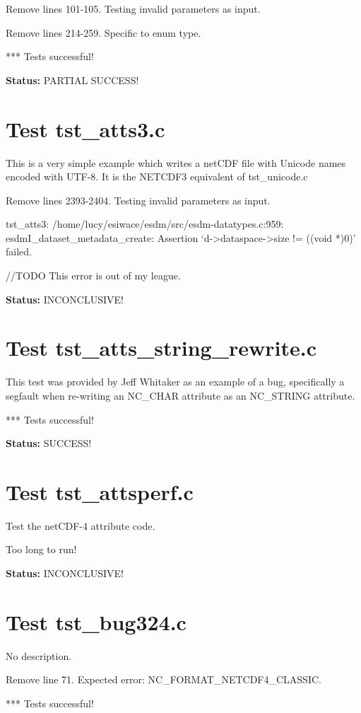 Remove lines 101-105. Testing invalid parameters as input.

Remove lines 214-259. Specific to enum type.

*** Tests successful!

{\bf \large Status: } PARTIAL SUCCESS!

\section{Test tst\_atts3.c}

This is a very simple example which writes a netCDF file with
Unicode names encoded with UTF-8. It is the NETCDF3 equivalent
of tst\_unicode.c

Remove lines 2393-2404. Testing invalid parameters as input.

tst\_atts3: /home/lucy/esiwace/esdm/src/esdm-datatypes.c:959: esdmI\_dataset\_metadata\_create: Assertion `d->dataspace->size != ((void *)0)' failed.

//TODO This error is out of my league.

{\bf \large Status: } INCONCLUSIVE!

\section{Test tst\_atts\_string\_rewrite.c}

This test was provided by Jeff Whitaker as an example of a bug,
specifically a segfault when re-writing an NC\_CHAR attribute as
an NC\_STRING attribute.

*** Tests successful!

{\bf \large Status: } SUCCESS!

\section{Test tst\_attsperf.c}

Test the netCDF-4 attribute code.

Too long to run!

{\bf \large Status: } INCONCLUSIVE!

\section{Test tst\_bug324.c}

No description.

Remove line 71. Expected error: NC\_FORMAT\_NETCDF4\_CLASSIC.

*** Tests successful!

